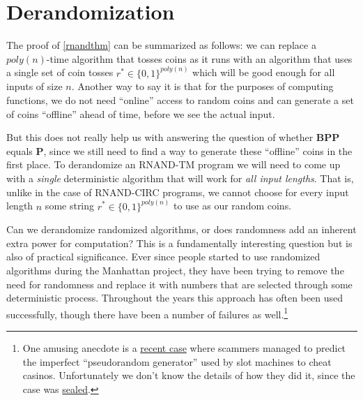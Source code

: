\section{Derandomization}\label{Derandomization}

The proof of \cref{rnandthm} can be summarized as follows: we can
replace a \(poly(n)\)-time algorithm that tosses coins as it runs with
an algorithm that uses a single set of coin tosses
\(r^* \in \{0,1\}^{poly(n)}\) which will be good enough for all inputs
of size \(n\). Another way to say it is that for the purposes of
computing functions, we do not need ``online'' access to random coins
and can generate a set of coins ``offline'' ahead of time, before we see
the actual input.

But this does not really help us with answering the question of whether
\(\mathbf{BPP}\) equals \(\mathbf{P}\), since we still need to find a
way to generate these ``offline'' coins in the first place. To
derandomize an RNAND-TM program we will need to come up with a
\emph{single} deterministic algorithm that will work for \emph{all input
lengths}. That is, unlike in the case of RNAND-CIRC programs, we cannot
choose for every input length \(n\) some string
\(r^* \in \{0,1\}^{poly(n)}\) to use as our random coins.

Can we derandomize randomized algorithms, or does randomness add an
inherent extra power for computation? This is a fundamentally
interesting question but is also of practical significance. Ever since
people started to use randomized algorithms during the Manhattan
project, they have been trying to remove the need for randomness and
replace it with numbers that are selected through some deterministic
process. Throughout the years this approach has often been used
successfully, though there have been a number of failures as
well.\footnote{One amusing anecdote is a
  \href{https://www.wired.com/2017/02/russians-engineer-brilliant-slot-machine-cheat-casinos-no-fix/}{recent
  case} where scammers managed to predict the imperfect ``pseudorandom
  generator'' used by slot machines to cheat casinos. Unfortunately we
  don't know the details of how they did it, since the case was
  \href{https://www.plainsite.org/dockets/2j3mlaig6/missouri-eastern-district-court/usa-v-bliev-et-al/}{sealed}.}

